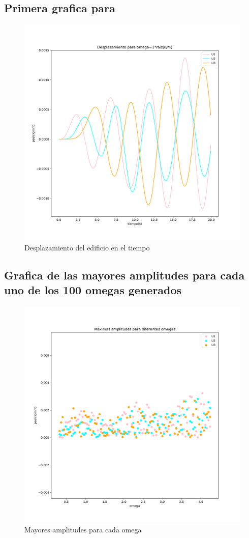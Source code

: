 \documentclass[11pt,letterpaper]{exam}
\begin{document}
\subsection{Primera grafica para}
\begin{figure}[H]
    \centering
    \includegraphics[width=1\textwidth]{plot_omegafijo.pdf}
    \caption{Desplazamiento del edificio en el tiempo}
    \label{fig:my_label}
\end{figure}
\subsection{Grafica de las mayores amplitudes para cada uno de los 100 omegas generados}
\begin{figure}[H]
    \centering
    \includegraphics[width=1\textwidth]{plot_omegas.pdf}
    \caption{Mayores amplitudes para cada omega}
    \label{fig:my_label}
\end{figure}
\end{document}
